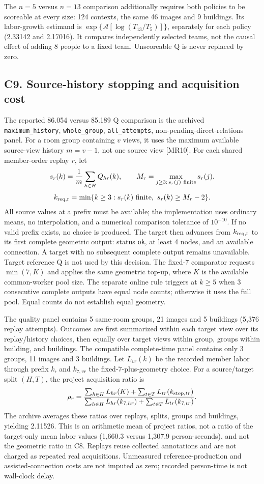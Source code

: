 The $n=5$ versus $n=13$ comparison additionally requires both policies to
be scoreable at every size: 124 contexts, the same 46 images and 9 buildings.
Its labor-growth estimand is
$\exp\{\mathcal A[\log(T_{13}/T_5)]\}$, separately for each policy
(2.33142 and 2.17016). It compares independently selected teams,
not the causal effect of adding 8 people to a fixed team.
Unscoreable Q is never replaced by zero.

\subsection*{C9. Source-history stopping and acquisition cost}
The reported 86.054 versus 85.189 Q comparison is the archived
\texttt{maximum\_history}, \texttt{whole\_group},
\texttt{all\_attempts}, non-pending-direct-relations panel.
For a room group containing $v$ views, it uses the maximum available
source-view history $m=v-1$, not one source view [MR10].
For each shared member-order replay $r$, let
\[
 s_r(k)=\frac{1}{m}\sum_{h\in H} Q_{hr}(k),\qquad
 M_r=\max_{j\geq3:\,s_r(j)\ {\rm finite}}s_r(j).
\]
\[
 k_{\rm req,r}=
 \min\{k\geq3:s_r(k)\ {\rm finite},\ s_r(k)\geq M_r-2\}.
\]
All source values at a prefix must be available; the implementation uses
ordinary means, no interpolation, and a numerical comparison tolerance
of $10^{-10}$. If no valid prefix exists, no choice is produced.
The target then advances from $k_{\rm req,r}$ to its first complete
geometric output: status \texttt{ok}, at least 4 nodes, and an available
connection. A target with no subsequent complete output remains unavailable.
Target reference Q is not used by this decision. The fixed-7 comparator
requests $\min(7,K)$ and applies the same geometric top-up, where $K$ is
the available common-worker pool size.
The separate online rule triggers at $k\geq5$ when 3 consecutive
complete outputs have equal node counts; otherwise it uses the full pool.
Equal counts do not establish equal geometry.

The quality panel contains 5 same-room groups, 21 images and 5
buildings (5,376 replay attempts). Outcomes are first summarized
within each target view over its replay/history choices, then equally
over target views within group, groups within building, and buildings.
The compatible complete-time panel contains only 3 groups,
11 images and 3 buildings. Let $L_{vr}(k)$ be the recorded member
labor through prefix $k$, and $k_{7,vr}$ the fixed-7-plus-geometry choice.
For a source/target split $(H,T)$, the project acquisition ratio is
\[
 \rho_r=
 \frac{\sum_{h\in H}L_{hr}(K)+
       \sum_{t\in T}L_{tr}(k_{{\rm stop},tr})}
      {\sum_{h\in H}L_{hr}(k_{7,hr})+
       \sum_{t\in T}L_{tr}(k_{7,tr})}.
\]
The archive averages these ratios over replays, splits, groups and buildings,
yielding 2.11526. This is an arithmetic mean of project ratios,
not a ratio of the target-only mean labor values
(1,660.3 versus 1,307.9 person-seconds), and not the geometric ratio in C8.
Replays reuse collected annotations and are not charged as repeated
real acquisitions. Unmeasured reference-production and assisted-connection
costs are not imputed as zero; recorded person-time is not wall-clock delay.

